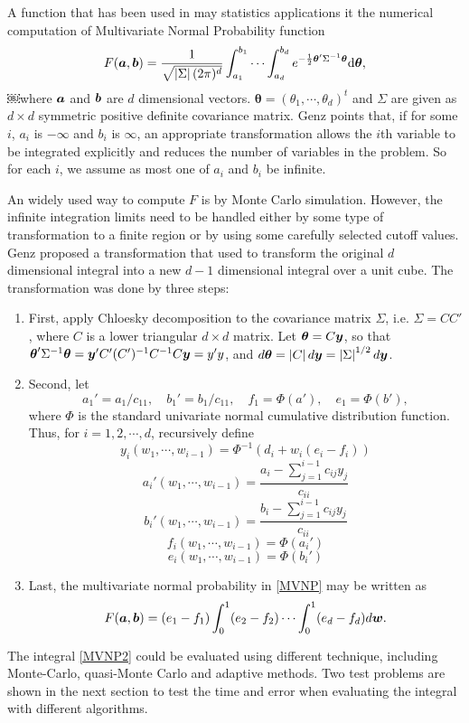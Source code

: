 \documentclass{iitthesis}
\theoremstyle{definition}
\begin{document}
A function that has been used in may statistics applications it the numerical computation of Multivariate Normal Probability function 
\begin{equation}\label{MVNP}
F(\boldsymbol{a},\boldsymbol{b}) = \frac{1}{\sqrt{\left \lvert \Sigma \right \rvert(2\pi)^d}}\int_{a_1}^{b_1}\cdots\int_{a_d}^{b_d} e^{-\frac{1}{2} \boldsymbol{\theta}'\Sigma^{-1}\boldsymbol{\theta} }{\rm d} \boldsymbol{\theta},
\end{equation}
￼where $\boldsymbol{a}$ and $\boldsymbol{b}$ are $d$ dimensional vectors. $\boldsymbol{\theta} = (\theta_1,\cdots,\theta_d)^t$ and $\Sigma$ are given as $d \times d$ symmetric positive definite covariance matrix. Genz \cite{Genz92} points that, if for some $i$, $a_i$ is $-\infty$ and $b_i$ is $\infty$, an appropriate transformation allows the $i$th variable to be integrated explicitly and reduces the number of variables in the problem. So for each $i$, we assume as most one of $a_i$ and $b_i$ be infinite. 

An widely used way to compute $F$ is by Monte Carlo simulation. However, the infinite integration limits need to be handled either by some type of transformation to a finite region or by using some carefully selected cutoff values. Genz\cite{Genz92, GenzBretz02} proposed a transformation that used to transform the original $d$ dimensional integral into a new $d-1$ dimensional integral over a unit cube. The transformation was done by three steps:
\begin{enumerate}
\item First, apply Chloesky decomposition to the covariance matrix $\Sigma$, i.e. $\Sigma = CC'$, where $C$ is a lower triangular $d \times d$ matrix. Let $\boldsymbol{\theta}=C \boldsymbol{y}$, so that $\boldsymbol{\theta}'\Sigma^{-1}\boldsymbol{\theta} = \boldsymbol{y}' C'(C')^{-1} C^{-1}C\boldsymbol{y} =y'y$, and $d\boldsymbol{\theta}=\left \lvert C \right \rvert d\boldsymbol{y} = \left \lvert \Sigma \right \rvert^{1/2} d\boldsymbol{y}$.
\item Second, let
$$a_1'=a_1/c_{11}, \quad b_1'=b_1/c_{11}, \quad f_1=\Phi(a'), \quad  e_1 = \Phi(b'),$$
where $\Phi$ is the standard univariate normal cumulative distribution function. 
Thus, for $i=1,2,\cdots,d$, recursively define
$$y_{i}(w_1,\cdots,w_{i-1}) = \Phi^{-1} (d_i+w_i(e_i-f_i))$$
$$a_i'(w_1,\cdots,w_{i-1}) = \frac{a_i-\sum_{j=1}^{i-1} c_{ij}y_j}{c_{ii}}$$
$$b_i'(w_1,\cdots,w_{i-1}) = \frac{b_i-\sum_{j=1}^{i-1} c_{ij}y_j}{c_{ii}}$$
$$f_i(w_1,\cdots,w_{i-1}) = \Phi(a_i')$$
$$e_i(w_1,\cdots,w_{i-1}) = \Phi(b_i')$$
\item Last, the multivariate normal probability in \eqref{MVNP} may be written as 
\begin{equation}\label{MVNP2}
F(\boldsymbol{a},\boldsymbol{b}) = (e_1-f_1)\int_0^1 (e_2-f_2) \cdots \int_0^1(e_d-f_d)d\boldsymbol{w}.
\end{equation}
\end{enumerate}
The integral \eqref{MVNP2} could be evaluated using different technique, including Monte-Carlo, quasi-Monte Carlo and adaptive methods. Two test problems are shown in the next section to test the time and error when evaluating the integral with different algorithms.
\end{document}
